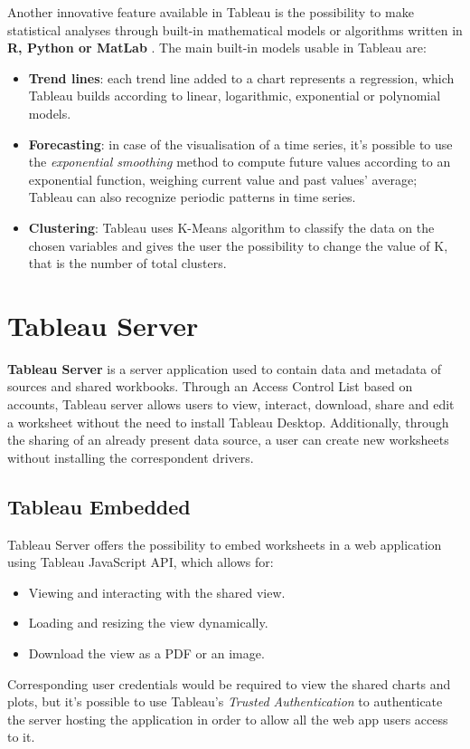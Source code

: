 Another innovative feature available in Tableau is the possibility to make statistical analyses through built-in mathematical models  or algorithms written in \textbf{R, Python or MatLab} \cite{LearningTableau}. The main built-in models usable in Tableau are:

\begin{itemize}
    \item \textbf{Trend lines}: each trend line added to a chart represents a regression, which Tableau builds according to linear, logarithmic, exponential or polynomial models.
    \item \textbf{Forecasting}: in case of the visualisation of a time series, it's possible to use the \textit{exponential smoothing} method to compute future values according to an exponential function, weighing current value and past values' average; Tableau can also recognize periodic patterns in time series.
    \item \textbf{Clustering}: Tableau uses K-Means algorithm to classify the data on the chosen variables and gives the user the possibility to change the value of K, that is the number of total clusters.
\end{itemize}

\section{Tableau Server}

\textbf{Tableau Server} is a server application used to contain data and metadata of sources and shared workbooks. Through an Access Control List based on accounts, Tableau server allows users to view, interact, download, share and edit a worksheet without the need to install Tableau Desktop. Additionally, through the sharing of an already present data source, a user can create new worksheets without installing the correspondent drivers.

\subsection{Tableau Embedded}

Tableau Server offers the possibility to embed worksheets in a web application using Tableau JavaScript API, which allows for:

\begin{itemize}
    \item Viewing and interacting with the shared view.
    \item Loading and resizing the view dynamically.
    \item Download the view as a PDF or an image.
\end{itemize}

Corresponding user credentials would be required to view the shared charts and plots, but it's possible to use Tableau's \textit{Trusted Authentication} to authenticate the server hosting the application in order to allow all the web app users access to it.